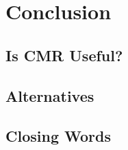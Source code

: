 \chapter{Conclusion}
\blindtext{}

\section{Is CMR Useful?}
\blindtext{}

\section{Alternatives}
\blindtext{}

\section{Closing Words}
\blindtext{}
